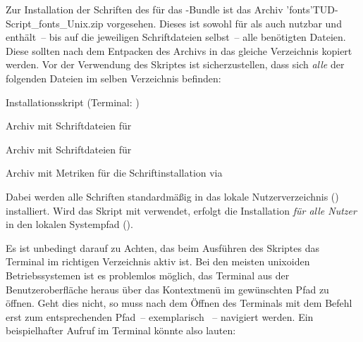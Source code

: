 Zur Installation der Schriften des \CDs für das \TUDScript-Bundle ist das 
Archiv \GitHubFile*'fonts'{TUD-Script_fonts_Unix.zip} vorgesehen. Dieses 
ist sowohl für \TeXLive als auch \MacTeX nutzbar und enthält~-- bis auf die 
jeweiligen Schriftdateien selbst~-- alle benötigten Dateien. Diese sollten nach 
dem Entpacken des Archivs in das gleiche Verzeichnis kopiert werden. Vor der 
Verwendung des Skriptes  ist sicherzustellen, 
dass sich \emph{alle} der folgenden Dateien im selben Verzeichnis befinden:
%
\settowidth{}%
\begin{description}[labelwidth=\tudscrdim,labelsep=.5em]
  \item[\File*{tudscr_fonts_install.sh}]Installationsskript
    (Terminal: )
  \item[\File*{Univers_PS.zip}]Archiv mit Schriftdateien für \Univers
  \item[\File*{DIN_Bd_PS.zip}]Archiv mit Schriftdateien für \DIN
  \item[\File*{tudscr_fonts_install.zip}]Archiv mit Metriken für die
    Schriftinstallation via 
\end{description}



Dabei werden alle Schriften standardmäßig in das lokale Nutzerverzeichnis 
() installiert. Wird das Skript mit  verwendet, 
erfolgt die Installation \emph{für alle Nutzer} in den lokalen Systempfad 
().

Es ist unbedingt darauf zu Achten, das beim Ausführen des Skriptes das Terminal 
im richtigen Verzeichnis aktiv ist. Bei den meisten unixoiden Betriebssystemen 
ist es problemlos möglich, das Terminal aus der Benutzeroberfläche heraus über 
das Kontextmenü im gewünschten Pfad zu öffnen. Geht dies nicht, so muss nach 
dem Öffnen des Terminals mit dem Befehl  erst zum entsprechenden 
Pfad~-- exemplarisch ~-- 
navigiert werden. Ein beispielhafter Aufruf im Terminal könnte also lauten:
%
\begin{quoting}
\RET*%
\RET%
\end{quoting}



